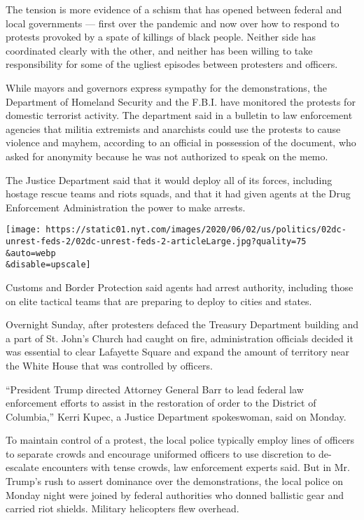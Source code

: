 The tension is more evidence of a schism that has opened between federal
and local governments --- first over the pandemic and now over how to
respond to protests provoked by a spate of killings of black people.
Neither side has coordinated clearly with the other, and neither has
been willing to take responsibility for some of the ugliest episodes
between protesters and officers.

While mayors and governors express sympathy for the demonstrations, the
Department of Homeland Security and the F.B.I. have monitored the
protests for domestic terrorist activity. The department said in a
bulletin to law enforcement agencies that militia extremists and
anarchists could use the protests to cause violence and mayhem,
according to an official in possession of the document, who asked for
anonymity because he was not authorized to speak on the memo.

The Justice Department said that it would deploy all of its forces,
including hostage rescue teams and riots squads, and that it had given
agents at the Drug Enforcement Administration the power to make arrests.

\texttt{[image: https://static01.nyt.com/images/2020/06/02/us/politics/02dc-unrest-feds-2/02dc-unrest-feds-2-articleLarge.jpg?quality=75\\\&auto=webp\\\&disable=upscale]}

Customs and Border Protection said agents had arrest authority,
including those on elite tactical teams that are preparing to deploy to
cities and states.

Overnight Sunday, after protesters defaced the Treasury Department
building and a part of St. John's Church had caught on fire,
administration officials decided it was essential to clear Lafayette
Square and expand the amount of territory near the White House that was
controlled by officers.

``President Trump directed Attorney General Barr to lead federal law
enforcement efforts to assist in the restoration of order to the
District of Columbia,'' Kerri Kupec, a Justice Department spokeswoman,
said on Monday.

To maintain control of a protest, the local police typically employ
lines of officers to separate crowds and encourage uniformed officers to
use discretion to de-escalate encounters with tense crowds, law
enforcement experts said. But in Mr. Trump's rush to assert dominance
over the demonstrations, the local police on Monday night were joined by
federal authorities who donned ballistic gear and carried riot shields.
Military helicopters flew overhead.

